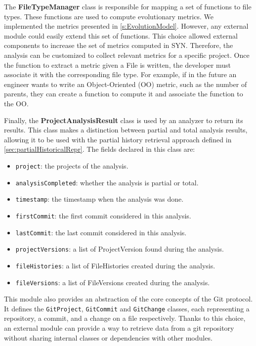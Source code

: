 The \textbf{FileTypeManager} class is responsible for mapping a set of functions to file types. These functions are used to compute evolutionary metrics. We implemented the metrics presented in \autoref{s:EvolutionModel}. However, any external module could easily extend this set of functions. This choice allowed external components to increase the set of metrics computed in SYN. Therefore, the analysis can be customized to collect relevant metrics for a specific project. Once the function to extract a metric given a File is written, the developer must associate it with the corresponding file type. For example, if in the future an engineer wants to write an  Object-Oriented (OO) metric, such as the number of parents, they can create a function to compute it and associate the function to the OO.

Finally, the \textbf{ProjectAnalysisResult} class is used by an analyzer to return its results. This class makes a distinction between partial and total analysis results, allowing it to be used with the partial history retrieval approach defined in \autoref{sec:partialHistoricalRepr}. The fields declared in this class are:
\begin{itemize}
    \item \texttt{project}: the projects of the analysis.
    \item \texttt{analysisCompleted}: whether the analysis is partial or total.
    \item \texttt{timestamp}: the timestamp when the analysis was done. 
    \item \texttt{firstCommit}: the first commit considered in this analysis. 
    \item \texttt{lastCommit}: the last commit considered in this analysis. 
    \item \texttt{projectVersions}: a list of ProjectVersion found during the analysis.
    \item \texttt{fileHistories}: a list of FileHistories created during the analysis.
    \item \texttt{fileVersions}: a list of FileVersions created during the analysis.
\end{itemize}

This module also provides an abstraction of the core concepts of the Git protocol. It defines the \texttt{GitProject}, \texttt{GitCommit} and \texttt{GitChange} classes, each representing a repository, a commit, and a change on a file respectively. 
Thanks to this choice, an external module can provide a way to retrieve data from a git repository without sharing internal classes or dependencies with other modules. 


